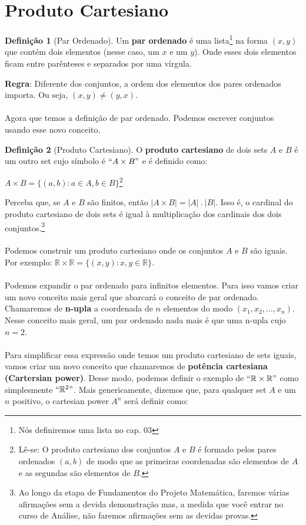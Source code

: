 \documentclass[a4paper,11pt,oneside]{book}
\theoremstyle{definition}
\theoremstyle{break}
\newtheorem{definition}{Definição}[section]
\begin{document}
\section{Produto Cartesiano}
\begin{definition}[Par Ordenado]
Um \textbf{par ordenado} é uma lista\footnote{Nós definiremos uma lista no cap. 03} na forma $(x, y)$ que contém dois elementos (nesse caso, um $x$ e um $y$). Onde esses dois elementos ficam entre parênteses e separados por uma vírgula.
\end{definition}

\textbf{Regra}: Diferente dos conjuntos, a ordem dos elementos dos pares ordenados importa. Ou seja, $(x,y) \neq (y,x)$. 
\\
\\
Agora que temos a definição de par ordenado. Podemos escrever conjuntos usando esse novo conceito.

\begin{definition}[Produto Cartesiano]
O \textbf{produto cartesiano} de dois sets $A$ e $B$ é um outro set cujo símbolo é $``A \times B"$ e é definido como:
\begin{center}
$A \times B = \{ (a,b) : a \in A, b \in B \}$\footnote{Lê-se: O produto cartesiano dos conjuntos $A$ e $B$ é formado pelos pares ordenados $(a,b)$ de modo que as primeiras coordenadas são elementos de $A$ e as segundas são elementos de $B$.}
\end{center}
\end{definition}

Perceba que, se $A$ e $B$ são finitos, então $| A \times B | = |A| \ . \ |B|$. Isso é, o cardinal do produto cartesiano de dois sets é igual à multiplicação dos cardinais dos dois conjuntos.\footnote{Ao longo da etapa de Fundamentos do Projeto Matemática, faremos várias afirmações sem a devida demonstração mas, a medida que você entrar no curso de Análise, não faremos afirmações sem as devidas provas.}
\\
\\
Podemos construir um produto cartesiano onde os conjuntos $A$ e $B$ são iguais. Por exemplo: $\mathbb{R} \times \mathbb{R} = \{ (x,y) : x,y \in \mathbb{R} \}$.
\\
\\
Podemos expandir o par ordenado para infinitos elementos. Para isso vamos criar um novo conceito mais geral que abarcará o conceito de par ordenado. Chamaremos de \textbf{n-upla} a coordenada de $n$ elementos do modo $(x_1, x_2, \dots, x_n)$. Nesse conceito mais geral, um par ordenado nada mais é que uma n-upla cujo $n = 2$.
\\
\\
Para simplificar essa expressão onde temos um produto cartesiano de sets iguais, vamos criar um novo conceito que chamaremos de \textbf{potência cartesiana (Cartersian power)}. Desse modo, podemos definir o exemplo de $``\mathbb{R} \times \mathbb{R}"$ como simplesmente $``\mathbb{R}^2"$. Mais genericamente, dizemos que, para qualquer set $A$ e um $n$ positivo, o cartesian power $A^n$ será definir como:
\end{document}
